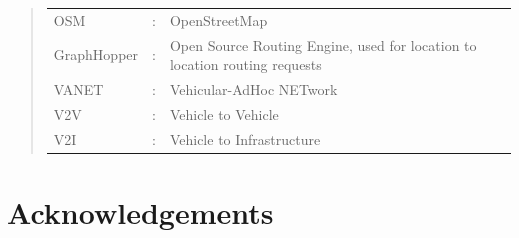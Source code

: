 \documentclass[ %
                    author={Alexander Hill},
                supervisor={Dr. Benjamin Sach},
                    degree={MEng},
                     title={MARMOSET},
                  subtitle={Multi-Agent Route Management using Online Simulation for Efficient Transportation},
                      type={research},
                      year={2016} ]{dissertation}
\begin{document}

\begin{quote}
\noindent
\begin{tabular}{lcl}
OSM                 &:     & OpenStreetMap \\
GraphHopper         &:     & Open Source Routing Engine, used for location to
    location routing requests \\
VANET               &:     & Vehicular-AdHoc NETwork \\
V2V                 &:     & Vehicle to Vehicle \\
V2I                 &:     & Vehicle to Infrastructure \\
\end{tabular}
\end{quote}


\chapter*{Acknowledgements}




%
\end{document}
